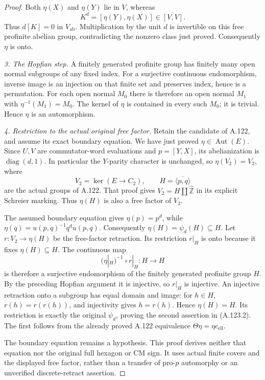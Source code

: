 \begin{proof}
Both \(\eta(X)\) and \(\eta(Y)\) lie in \(V\), whereas
\[
 K^d=[\eta(Y),\eta(X)]\in\overline{[V,V]}.
\]
Thus \(d[K]=0\) in \(V_{\mathrm{ab}}\). Multiplication by
the unit \(d\) is invertible on this free profinite abelian
group, contradicting the nonzero class just proved.
Consequently \(\eta\) is onto.

\emph{3. The Hopfian step.}
A finitely generated profinite group has finitely many open
normal subgroups of any fixed index. For a surjective continuous
endomorphism, inverse image is an injection on that finite set
and preserves index, hence is a permutation.
For each open normal \(M_0\) there is therefore an open normal
\(M_1\) with \(\eta^{-1}(M_1)=M_0\).
The kernel of \(\eta\) is contained in every such \(M_0\);
it is trivial. Hence \(\eta\) is an automorphism.

\emph{4. Restriction to the actual original free factor.}
Retain the candidate of A.122, and assume its exact boundary
equation. We have just proved \(\eta\in\operatorname{Aut}(E)\).
Since \(U,V\) are commutator-word evaluations and \(p=[Y,X]\),
its abelianization is \(\operatorname{diag}(d,1)\).
In particular the \(Y\)-parity character is unchanged, so
\(\eta(V_2)=V_2\), where
\[
 V_2=\ker(E\longrightarrow C_2),\qquad
 H=\overline{\langle p,q\rangle}
\]
are the actual groups of A.122.
That proof gives \(V_2=H\amalg\widehat{\mathbb Z}\) in its
explicit Schreier marking. Thus \(\eta(H)\) is also a free
factor of \(V_2\).

The assumed boundary equation gives \(\eta(p)=p^d\), while
\(\eta(q)=u(p,q)^{-1}q^du(p,q)\).
Consequently \(\eta(H)=\psi_d(H)\subseteq H\).
Let \(r:V_2\to\eta(H)\) be the free-factor retraction.
Its restriction \(r|_H\) is onto because it fixes
\(\eta(H)\subseteq H\). The continuous map
\[
 (\eta|_H)^{-1}\circ r|_H:H\longrightarrow H
\]
is therefore a surjective endomorphism of the finitely generated
profinite group \(H\). By the preceding Hopfian argument it is
injective, so \(r|_H\) is injective. An injective retraction
onto a subgroup has equal domain and image: for \(h\in H\),
\(r(h)=r(r(h))\), and injectivity gives \(h=r(h)\).
Hence \(\eta(H)=H\). Its restriction is exactly the original
\(\psi_d\), proving the second assertion in (A.123.2).
The first follows from the already proved A.122 equivalence
\(\Theta\eta=\eta c_{\mathrm{ell}}\).

The boundary equation remains a hypothesis. This proof derives
neither that equation nor the original full hexagon or CM sign.
It uses actual finite covers and the displayed free factor,
rather than a transfer of pro-\(p\) automorphy or an unverified
discrete-retract assertion.
\end{proof}
